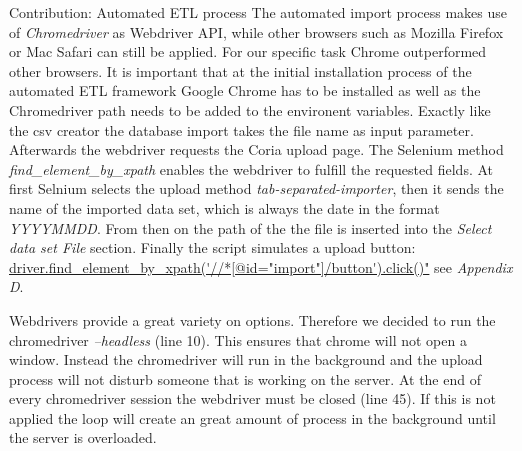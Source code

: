 \documentclass[conference, 11pt]{IEEEtran}
\begin{document}
\begin{subsection}{Contribution: Automated ETL process}
The automated import process makes use of \textit{Chromedriver} as Webdriver API, while other browsers such as Mozilla Firefox or Mac Safari can still be applied. For our specific task Chrome outperformed other browsers. It is important that at the initial installation process of the automated ETL framework Google Chrome has to be installed as well as the Chromedriver path needs to be added to the environent variables. Exactly like the csv creator the database import takes the file name as input parameter.
Afterwards the webdriver requests the Coria upload page. The Selenium method \textit{find\_element\_by\_xpath} enables the webdriver to fulfill the requested fields.
At first Selnium selects the upload method \textit{tab-separated-importer}, then it sends the name of the imported data set, which is always the date in the format \textit{YYYYMMDD}.
From then on the path of the the file is inserted into the \textit{Select data set File} section. 
Finally the script simulates a upload button: \url{driver.find_element_by_xpath('//*[@id="import"]/button').click()"} see \textit{Appendix D}. \\ \linebreak

Webdrivers provide a great variety on options. Therefore we decided to run the chromedriver \textit{--headless} (line 10). This ensures that chrome will not open a window. Instead the chromedriver will run in the background and the upload process will not disturb someone that is working on the server. At the end of every chromedriver session the webdriver must be closed (line 45). If this is not applied the loop will create an great amount of process in the background until the server is overloaded.
\linebreak


\end{subsection}
\end{document}
